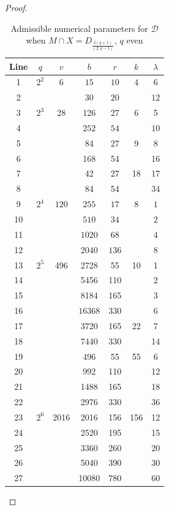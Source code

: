 \documentclass[a4paper,twopage,reqno,12pt]{amsart}
\theoremstyle{definition}
\numberwithin{equation}{section}
\begin{document}
\begin{proof}
\begin{table}[H]
\tiny
    \centering 
    \caption{\tiny Admissible numerical parameters for $\mathcal{D}$ when  $M\cap X=D_{\frac{2(q+1)}{(2,q-1)}} $, $q$ even
    }%
     \begin{tabular}{ccccccc}
     \toprule
    Line & $q$ & $v$ & $b$ & $r$ & $k$ & $\lambda$ \\
    \midrule
    1 & $2^2$ & $6$ & $15$ & $10$ & $4$ & $6$ \\
       2 & &  & $30$ & $20$ & & $12$ \\
        3 & $2^3$ & 28 & 126 & 27 & 6 & 5\\
        4 &  &  & $252$ & $54$ & & $10$ \\
       {5} & &  & 84 & 27 & 9 & 8 \\
       {6} &  &  & 168 & 54 &  & 16 \\
        {7} &  &  & 42 & 27 & 18 & 17 \\
       {8} & &  & 84 & 54 & & 34 \\
       9 & $2^4$&  $120$    & $255$ & $17$ &   $8$  & $1$ \\
        10& &      & $510$ & $34$ &    & $2$ \\
       11 & &     & $1020$ & $68$ &    & $4$ \\
       12 &           &      & $2040$ & $136$ &     & $8$ \\
       13 & $2^5$ & 496 & 2728 & 55 & 10 & 1\\
       14 &  &  & 5456 & 110 & & 2\\
       15 & & & 8184 & 165 &  & 3\\
       16 &  &  & %
       $16368$ & $330$ &  & $6$ \\
       {17} &  &  & 3720  &  165 &  22 & 7  \\
        {18} &  &  & 7440  &  330 &   & 14  \\
        {19} &  &  &  496 & 55  & 55  & 6  \\
        {20} &  &  & 992  &  110 &   & 12  \\
        {21} &  &  & 1488  &  165 &   & 18  \\
        {22} &  &  & 2976  &  330 &   & 36  \\
        {23} & $2^6$ & 2016 & 2016  &  156 & 156  & 12  \\
        {24} &  &  & 2520  &  195 &   & 15  \\
        {25} &  &  & 3360  &  260 &   & 20  \\
        {26} &  &  & 5040  &  390 &   & 30  \\
        {27} &  &  & 10080  & 780 &  & 60  \\
        \bottomrule
    \end{tabular}\label{tab:parameters.3.9.5}
\end{table}


\end{proof}
\end{document}
